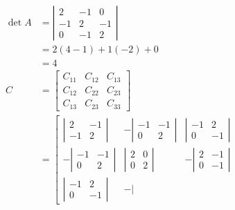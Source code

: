\documentclass[main.tex]{subfiles}
\begin{document}
\begin{enumerate}
\begin{enumerate}
        $$
        \begin{aligned}
        \operatorname{det} A &=\left|\begin{array}{ccc}
        2 & -1 & 0 \\
        -1 & 2 & -1 \\
        0 & -1 & 2
        \end{array}\right| \\
        &=2(4-1)+1(-2)+0 \\
        &=4\\
        C &=\left[\begin{array}{lll}
        C_{11} & C_{12} & C_{13} \\
        C_{12} & C_{22} & C_{23} \\
        C_{13} & C_{23} & C_{33}
        \end{array}\right] \\
        &=\left[\begin{array}{ccc}
        \left|\begin{array}{cc}
        2 & -1 \\
        -1 & 2
        \end{array}\right| & -\left|\begin{array}{cc}
        -1 & -1 \\
        0 & 2
        \end{array}\right| & \left|\begin{array}{cc}
        -1 & 2 \\
        0 & -1
        \end{array}\right| \\
        -\left|\begin{array}{cc}
        -1 & -1 \\
        0 & 2
        \end{array}\right| & \left|\begin{array}{cc}
        2 & 0 \\
        0 & 2
        \end{array}\right| & -\left|\begin{array}{cc}
        2 & -1 \\
        0 & -1
        \end{array}\right| \\
        \left|\begin{array}{cc}
        -1 & 2 \\
        0 & -1
        \end{array}\right| & -\left|\begin{array}{ll}

\end{array}
\end{array}
\end{aligned}$$
\end{enumerate}
\end{enumerate}
\end{document}
